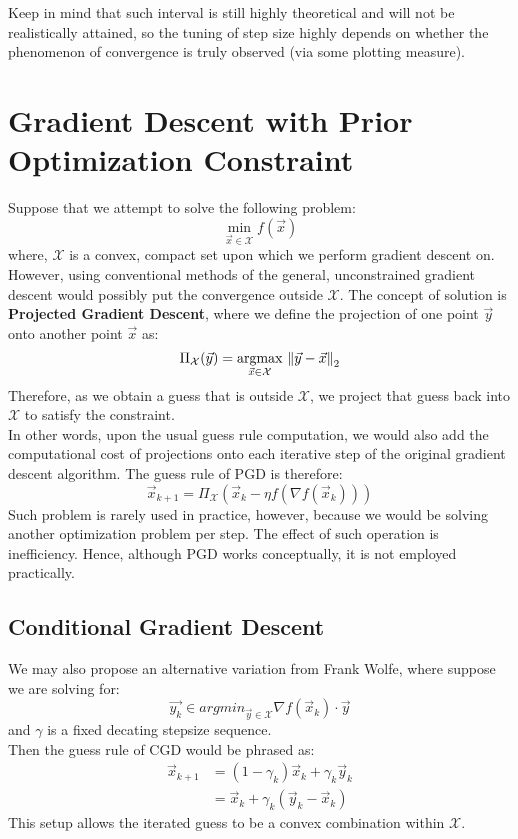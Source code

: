 Keep in mind that such interval is still highly theoretical and will not be realistically attained, so the tuning of step size highly depends on whether the phenomenon of convergence is truly observed (via some plotting measure).

\section{Gradient Descent with Prior Optimization Constraint}
Suppose that we attempt to solve the following problem:
\[
    \min_{\vec{x} \in \mathcal{X}} f(\vec{x})
\]
where, $\mathcal{X}$ is a convex, compact set upon which we perform gradient descent on. \\
However, using conventional methods of the general, unconstrained gradient descent would possibly put the convergence outside $\mathcal{X}$.
The concept of solution is \textbf{Projected Gradient Descent}, where we define the projection of one point $\vec{y}$ onto another point $\vec{x}$ as:
\[
    \Pi_{\mathcal{X}} (\vec{y}) = \underset{\vec{x} \in \mathcal{X}}{\rm argmax}\ {\| \vec{y} - \vec{x} \|}_{2}^{}
\]
Therefore, as we obtain a guess that is outside $\mathcal{X}$, we project that guess back into $\mathcal{X}$ to satisfy the constraint. \\
In other words, upon the usual guess rule computation, we would also add the computational cost of projections onto each iterative step of the original gradient descent algorithm.
The guess rule of PGD is therefore:
\[
    \vec{x}_{k + 1} = \Pi_{\mathcal{X}} (\vec{x}_k - \eta f(\nabla f(\vec{x}_k)))
\]
Such problem is rarely used in practice, however, because we would be solving another optimization problem per step.
The effect of such operation is inefficiency.
Hence, although PGD works conceptually, it is not employed practically.

\subsection{Conditional Gradient Descent}
We may also propose an alternative variation from Frank Wolfe, where suppose we are solving for:
\[
    \vec{y_k} \in {argmin}_{\vec{y} \in \mathcal{X}} \nabla f(\vec{x}_k) \cdot \vec{y}
\]
and $\gamma$ is a fixed decating stepsize sequence. \\
Then the guess rule of CGD would be phrased as:
\begin{align*}
    \vec{x}_{k + 1}
    &= (1 - \gamma_k) \vec{x}_k + \gamma_k \vec{y}_k \\
    &= \vec{x}_k + \gamma_k (\vec{y}_k - \vec{x}_k)
\end{align*}
This setup allows the iterated guess to be a convex combination within $\mathcal{X}$.
